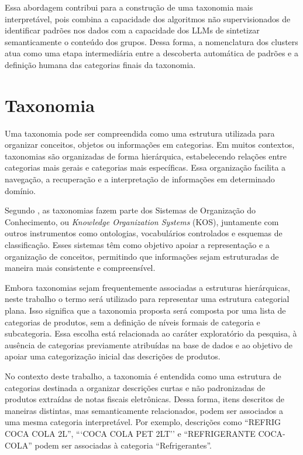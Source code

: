 \documentclass[english,brazilian]{UNISINOSmonografia}
\begin{document}
Essa abordagem contribui para a construção de uma taxonomia mais interpretável, pois combina a capacidade dos algoritmos não supervisionados de identificar padrões nos dados com a capacidade dos LLMs de sintetizar semanticamente o conteúdo dos grupos. Dessa forma, a nomenclatura dos clusters atua como uma etapa intermediária entre a descoberta automática de padrões e a definição humana das categorias finais da taxonomia.









\section{Taxonomia}

Uma taxonomia pode ser compreendida como uma estrutura utilizada para organizar conceitos, objetos ou informações em categorias. Em muitos contextos, taxonomias são organizadas de forma hierárquica, estabelecendo relações entre categorias mais gerais e categorias mais específicas. Essa organização facilita a navegação, a recuperação e a interpretação de informações em determinado domínio.

Segundo \cite{souza2010taxonomy}, as taxonomias fazem parte dos Sistemas de Organização do Conhecimento, ou \textit{Knowledge Organization Systems} (KOS), juntamente com outros instrumentos como ontologias, vocabulários controlados e esquemas de classificação. Esses sistemas têm como objetivo apoiar a representação e a organização de conceitos, permitindo que informações sejam estruturadas de maneira mais consistente e compreensível.

Embora taxonomias sejam frequentemente associadas a estruturas hierárquicas, neste trabalho o termo será utilizado para representar uma estrutura categorial plana. Isso significa que a taxonomia proposta será composta por uma lista de categorias de produtos, sem a definição de níveis formais de categoria e subcategoria. Essa escolha está relacionada ao caráter exploratório da pesquisa, à ausência de categorias previamente atribuídas na base de dados e ao objetivo de apoiar uma categorização inicial das descrições de produtos.

No contexto deste trabalho, a taxonomia é entendida como uma estrutura de categorias destinada a organizar descrições curtas e não padronizadas de produtos extraídas de notas fiscais eletrônicas. Dessa forma, itens descritos de maneiras distintas, mas semanticamente relacionados, podem ser associados a uma mesma categoria interpretável. Por exemplo, descrições como ``REFRIG COCA COLA 2L'', ```COCA COLA PET 2LT'' e ``REFRIGERANTE COCA-COLA'' podem ser associadas à categoria ``Refrigerantes''.
\end{document}

